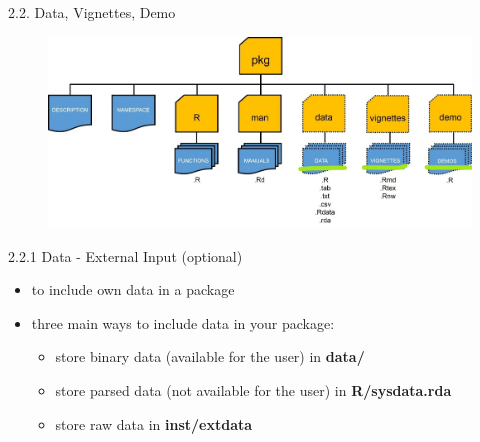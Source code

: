 \documentclass[11pt,a4paper]{beamer}
\begin{document}
\begin{frame}[t]{2.2. Data, Vignettes, Demo}
	
	
	\begin{figure}
		\centering
		\includegraphics[width=0.9\linewidth]{opt}
		\label{fig:packages}
	\end{figure}
	
	
\end{frame}










\begin{frame}[t]{2.2.1 Data - External Input (optional)}
	
	\begin{itemize}
		\item to	include	own data	in	a	package
		\item three	main	ways	to	include	data	in	your	package:
		\begin{itemize}
			\item store	binary	data (available for the user) in \textbf{data/}
			\item store	parsed	data (not available for the user) in
			\textbf{R/sysdata.rda}
			\item store	raw	data in	\textbf{inst/extdata}
		\end{itemize}

	\end{itemize}
	
\end{frame}
\end{document}
